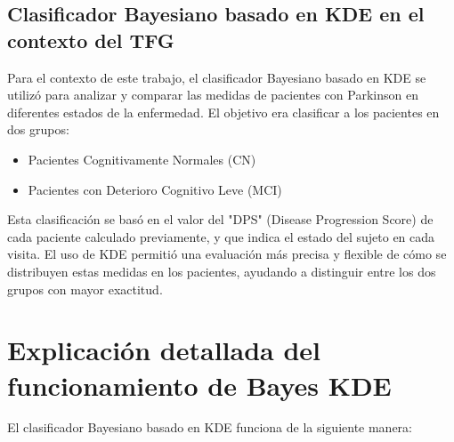 \subsection{Clasificador Bayesiano basado en KDE en el contexto del TFG}
Para el contexto de este trabajo, el clasificador Bayesiano basado en KDE se utilizó para analizar y comparar las medidas de pacientes con Parkinson en diferentes estados de la enfermedad. El objetivo era clasificar a los pacientes en dos grupos:
\begin{itemize}
	\item Pacientes Cognitivamente Normales (CN)
	\item Pacientes con Deterioro Cognitivo Leve (MCI)
\end{itemize}

Esta clasificación se basó en el valor del "DPS" (Disease Progression Score) de cada paciente calculado previamente, y que indica el estado del sujeto en cada visita. El uso de KDE permitió una evaluación más precisa y flexible de cómo se distribuyen estas medidas en los pacientes, ayudando a distinguir entre los dos grupos con mayor exactitud.\\

\section{Explicación detallada del funcionamiento de Bayes KDE}

El clasificador Bayesiano basado en KDE funciona de la siguiente manera:

